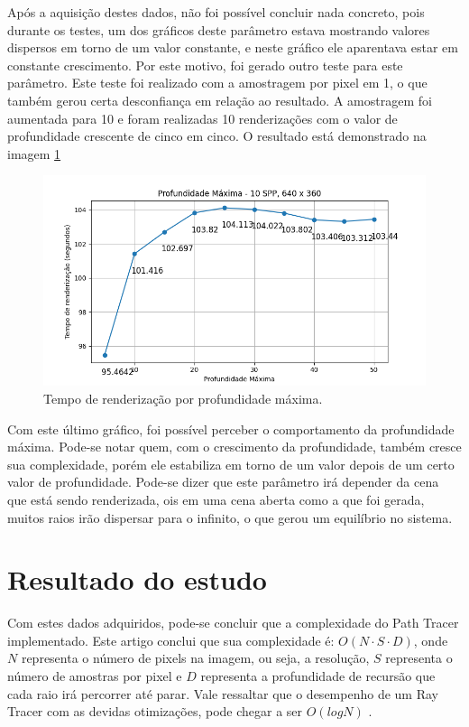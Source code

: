 \documentclass[journal]{IEEEtran}
\begin{document}
Após a aquisição destes dados, não foi possível concluir nada concreto, pois durante os testes, um dos gráficos
deste parâmetro estava mostrando valores dispersos em torno de um valor constante, e neste gráfico ele aparentava
estar em constante crescimento. Por este motivo, foi gerado outro teste para este parâmetro. Este teste foi realizado
com a amostragem por pixel em 1, o que também gerou certa desconfiança em relação ao resultado. A amostragem foi 
aumentada para 10 e foram realizadas 10 renderizações com o valor de profundidade crescente de cinco em cinco.
O resultado está demonstrado na imagem \ref{img_desktop_md2}

\begin{figure}[ht]
  \centering
  \includegraphics[width=\linewidth]{media/Desktop_MD_10SPP_10x.png}
  \caption{Tempo de renderização por profundidade máxima.}
  \label{img_desktop_md2}
\end{figure}

Com este último gráfico, foi possível perceber o comportamento da profundidade máxima. Pode-se notar quem, com o 
crescimento da profundidade, também cresce sua complexidade, porém ele estabiliza em torno de um valor depois de
um certo valor de profundidade. Pode-se dizer que este parâmetro irá depender da cena que está sendo renderizada,
ois em uma cena aberta como a que foi gerada, muitos raios irão dispersar para o infinito, o que gerou um equilíbrio
no sistema.

\section{Resultado do estudo}
Com estes dados adquiridos, pode-se concluir que a complexidade do Path Tracer implementado. Este artigo conclui que
sua complexidade é: $O(N \cdot S \cdot D)$, onde $N$ representa o número de pixels na imagem, ou seja, a resolução,
$S$ representa o número de amostras por pixel e $D$ representa a profundidade de recursão que cada raio irá percorrer
até parar. Vale ressaltar que o desempenho de um Ray Tracer com as devidas otimizações, pode chegar a ser
$O( log N  )$ \cite{c18}.
\end{document}
